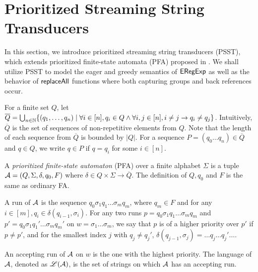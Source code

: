 
\section{Prioritized Streaming String Transducers}  \label{sect:psst}

In this section, we introduce prioritized streaming string transducers (PSST), which extends prioritized finite-state automata (PFA) proposed in \cite{BM17}. We shall utilize PSST to model  the eager and greedy semantics of ${\sf ERegExp}$ as well as the behavior of $\mathsf{replaceAll}$ functions where both capturing groups and back references occur.

%
For a finite set $Q$, let $\overline{Q} = \bigcup_{n\in \mathbb{N}}\{ (q_1, \ldots, q_n) \mid \forall i \in [n], q_i \in Q \wedge \forall i,j \in[n], i \neq j \rightarrow q_i \neq q_j \}$. Intuitively, $\overline{Q}$ is the set of sequences of non-repetitive elements from $Q$. Note that the length of each sequence from $\overline{Q}$ is bounded by  $| Q |$. For a sequence $P = (q_0 \ldots q_n) \in \overline{Q}$ and  $q \in Q$, we write $q \in P$ if  $q = q_i$ for some $i \in [n]$. 


\begin{definition}
  A \emph{prioritized finite-state automaton} (PFA) over a finite alphabet $\Sigma$ is a tuple $\mathcal{A}=(Q, \Sigma, \delta, q_0, F)$ where $\delta \in Q
  \times \Sigma \rightarrow \overline{Q}$. The definition of $Q, q_0$ and $F$ is the same as ordinary FA.
  
A run of $\mathcal{A}$ is the sequence $q_0 \sigma_1 q_1 \ldots \sigma_m q_m$, where $q_m \in F$ and for any $i \in [m], q_i \in \delta (q_{i - 1}, \sigma_i)$. For any two runs $p = q_0 \sigma_1 q_1 \ldots \sigma_m q_m$ and $p' =  q_0 \sigma_1 q_1' \ldots \sigma_m q_m'$ on $w = \sigma_1 \ldots \sigma_m$, we say that $p$ is of a higher priority over  $p'$ if $p \neq p'$, and for the smallest index $j$ with $q_j \neq q_j'$, $\delta (q_{j - 1}, \sigma_j) = \ldots q_j \ldots q_j' \ldots$.
  
An accepting run of $\mathcal{A}$ on $w$ is the one with the highest priority. The language of $\mathcal{A}$, denoted as $\mathscr{L}(\mathcal{A})$, is the set of
 strings on which $\mathcal{A}$ has an accepting run.
\end{definition}

